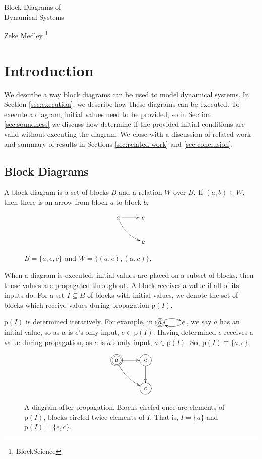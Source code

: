 \documentclass[twocolumn]{article}
\begin{document}
\LARGE
\noindent Block Diagrams of \\ Dynamical Systems \par
\vspace{0.68em}
\large
\noindent Zeke Medley \footnote[1]{BlockScience}
\normalsize

\section{Introduction}

We describe a way block diagrams can be used to model dynamical systems. In Section \ref{sec:execution}, we describe how these diagrams can be executed. To execute a diagram, initial values need to be provided, so in Section \ref{sec:soundness} we discuss how determine if the provided initial conditions are valid without executing the diagram. We close with a discussion of related work and summary of results in Sections \ref{sec:related-work} and \ref{sec:conclusion}.

\subsection{Block Diagrams}

A block diagram is a set of blocks $B$ and a relation $W$ over $B$. If $(a, b)\in W$, then there is an arrow from block $a$ to block $b$.


\begin{figure}[h]
\[
    \xymatrix {
        a \ar[r] \ar@/_/[dr] & e \\
        & c
    }
\]
    \caption{$B=\{a, e, c\}$ and $W=\{(a,e), (a, c)\}$.}
    \label{fig:example1}
\end{figure}

When a diagram is executed, initial values are placed on a subset of blocks, then those values are propagated throughout. A block receives a value if all of its inputs do. For a set $I\subseteq B$ of blocks with initial values, we denote the set of blocks which receive values during propagation $\text{p}(I)$.

$\text{p}(I)$ is determined iteratively. For example, in $\xymatrix@1{*++++[o][F=]{a} \ar@/^/[r] & e \ar@/^/[l]}$, we say $a$ has an initial value, so as $a$ is $e$'s only input, $e\in \text{p}(I)$. Having determined $e$ receives a value during propagation, as $e$ is $a$'s only input, $a\in \text{p}(I)$. So, $\text{p}(I)\equiv \{a, e\}$.

\begin{figure}[h]
\[
    \xymatrix {
        *++[o][F=]{a} \ar[r] \ar@/_/[dr] & *++[o][F-]{e} \ar[d] \\
        & *++[o][F-]{c}
    }
\]
    \caption{A diagram after propagation. Blocks circled once are elements of $\text{p}(I)$, blocks circled twice elements of $I$. That is, $I=\{a\}$ and $\text{p}(I)=\{e, c\}$.}
    \label{fig:piisnoti}
\end{figure}
\end{document}
